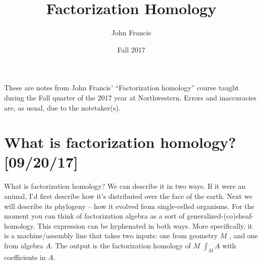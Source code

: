 \documentclass{amsart}
\title{Factorization Homology}
\author{John Francis}
\date{Fall 2017}
\begin{document}
\maketitle
\tableofcontents

These are notes from John Francis' ``Factorization homology'' course 
taught during the Fall quarter of the 2017 year at Northwestern. 
Errors and inaccuracies are, as usual, due to the notetaker(s).


\section{What is factorization homology? [09/20/17]}

What is factorization homology? We can describe it in two ways. If it 
were an animal, I'd first describe how it's distributed over the face of the earth.
Next we will describe its phylogeny -- how it evolved from single-celled organisms.
For the moment you can think of factorization algebra as a sort of 
generalized-(co)sheaf-homology. This expression can be hyphenated in both ways.
More specifically, it is a machine/assembly line that takes two inputs:
one from geometry $M$ , and one from algebra $A$. The output is
the factorization homology of $M$ $\int_M A$ with coefficients in $A$.
\end{document}
